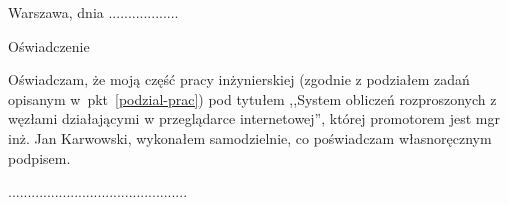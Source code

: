 \documentclass[a4paper,11pt,twoside]{report}
\theoremstyle{definition}
\newcommand{\tytul}{System obliczeń rozproszonych z węzłami działającymi w przeglądarce internetowej}
\renewcommand{\title}{A system for distributed computing with web browser--based nodes}
\newcommand{\type}{inżyniers} %
\newcommand{\supervisor}{mgr inż. Jan Karwowski}
\begin{document}
\null\thispagestyle{empty}\newpage

{
\begin{abstract}

\begin{center}
\title
\end{center}

Lorem ipsum dolor sit amet, consetetur sadipscing elitr, sed diam nonumyeirmod tempor invidunt ut labore et dolore magna aliquyam erat, sed diamvoluptua. At vero eos et accusam et justo duo dolores et ea rebum. Stet clita kasd gubergren, no sea takimata sanctus est Lorem ipsum dolor sit amet.

Lorem ipsum dolor sit amet, consetetur sadipscing elitr, sed diam nonumyeirmod tempor invidunt ut labore et dolore magna aliquyam erat, sed diamvoluptua. At vero eos et accusam et justo duo dolores et ea rebum. Stet clita kasd gubergren, no sea takimata sanctus est Lorem ipsum dolor sit amet.\\

\noindent \textbf{Keywords:} distributed computing, WebAssembly, web application, performance, parallel computing, web browser, Internet
\end{abstract}
}




\null\thispagestyle{empty}\newpage

\null \hfill Warszawa, dnia ..................\\

\par\vspace{5cm}

\begin{center}
Oświadczenie
\end{center}

\indent Oświadczam, że moją część pracy \type kiej (zgodnie z podziałem zadań opisanym w~pkt~\ref{podzial-prac}) pod
tytułem ,,\tytul '', której promotorem jest \supervisor , wykonałem
samodzielnie, co poświadczam własnoręcznym podpisem.
\vspace{2cm}


\begin{flushright}
  \begin{minipage}{50mm}
    \begin{center}
      ..............................................

    \end{center}
  \end{minipage}
\end{flushright}
\end{document}

